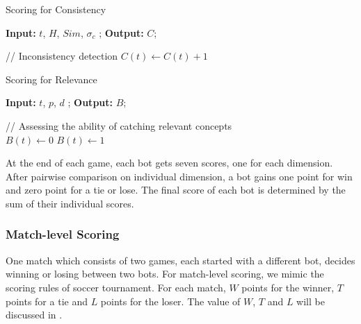 \begin{algorithm}[th]
\small
\caption{Scoring for Consistency}
\label{algo:inconsist}
\hspace*{0.02in} {\bf Input:}
$t$, $H$, $Sim$, $\sigma_{c}$
; \hspace*{0.02in} {\bf Output:  } 
 $C$;
\begin{algorithmic}[1]
\State // Inconsistency detection
    \State $C(t) \leftarrow C(t) + 1$
   \EndIf
  \EndIf
\end{algorithmic}
\end{algorithm}

\begin{algorithm}[th]
\small
\caption{Scoring for Relevance}
\label{algo:bonus}
\hspace*{0.02in} {\bf Input:}
$t$, $p$, $d$
; \hspace*{0.02in} {\bf Output:  } 
$B$;
\begin{algorithmic}[1]
\State // Assessing the ability of catching relevant concepts\\
$B(t) \leftarrow 0$
   \State $B(t) \leftarrow 1$
  \EndIf
 \EndFor
\end{algorithmic}
\end{algorithm}

At the end of each game, each bot gets seven scores, one for each dimension.  
After pairwise comparison on individual dimension, a bot gains one point for win and zero point for a tie or lose.
The final score of each bot is determined by the sum of their individual scores.

\subsubsection*{Match-level Scoring}
One match which consists of two games, each started with a different bot, 
decides winning or losing between two bots.
For match-level scoring, we mimic the scoring rules of soccer tournament. 
For each match, $W$ points for the winner,  
$T$ points for a tie and 
$L$ points for the loser.
The value of $W$, $T$ and $L$ will be discussed in . 

